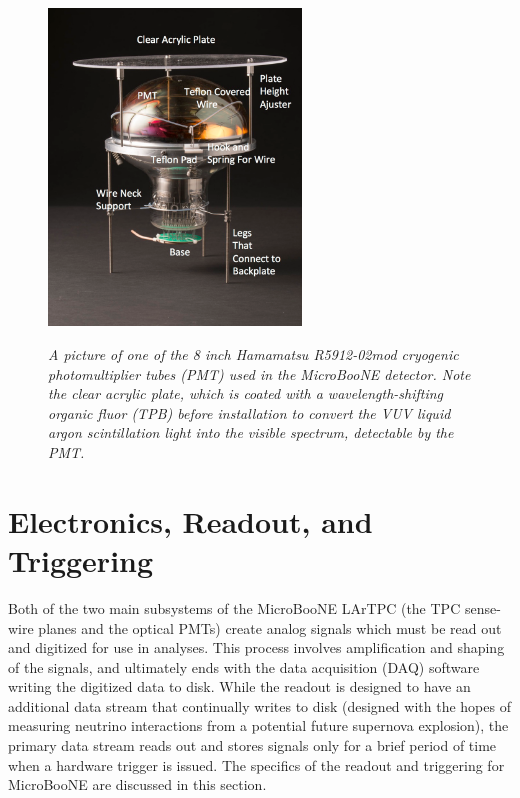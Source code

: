 \begin{figure}[ht!]
\centering
	\includegraphics[width=0.6\textwidth]{Figures/mount_PMT_labeled.png} \\
\caption{\textit{A picture of one of the 8 inch Hamamatsu R5912-02mod cryogenic photomultiplier tubes (PMT) used in the MicroBooNE detector. Note the clear acrylic plate, which is coated with a wavelength-shifting organic fluor (TPB) before installation to convert the VUV liquid argon scintillation light into the visible spectrum, detectable by the PMT.}}\label{pmt_mount_fig}
\end{figure}


\section{Electronics, Readout, and Triggering}
Both of the two main subsystems of the MicroBooNE LArTPC (the TPC sense-wire planes and the optical PMTs) create analog signals which must be read out and digitized for use in analyses. This process involves amplification and shaping of the signals, and ultimately ends with the data acquisition (DAQ) software writing the digitized data to disk. While the readout is designed to have an additional data stream that continually writes to disk (designed with the hopes of measuring neutrino interactions from a potential future supernova explosion), the primary data stream reads out and stores signals only for a brief period of time when a hardware trigger is issued. The specifics of the readout and triggering for MicroBooNE are discussed in this section.\\

